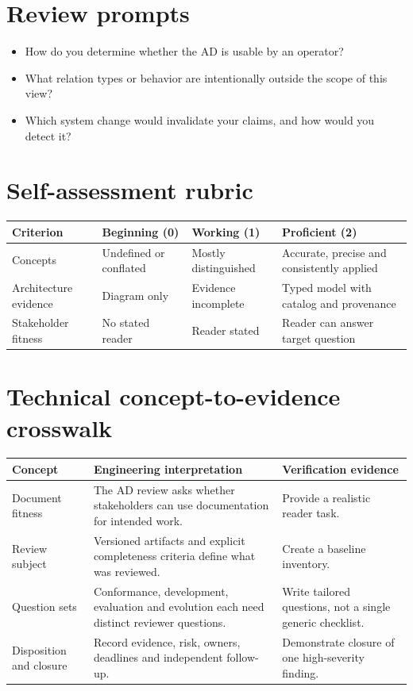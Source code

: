 \documentclass[10pt,letterpaper]{article}
\begin{document}
\section{Review prompts}
\begin{itemize}
\item How do you determine whether the AD is usable by an operator?
\item What relation types or behavior are intentionally outside the scope of this view?
\item Which system change would invalidate your claims, and how would you detect it?
\end{itemize}
\section{Self-assessment rubric}
\small
\begin{tabularx}{\linewidth}{@{}YYYY@{}}
\toprule
\textbf{Criterion} & \textbf{Beginning (0)} & \textbf{Working (1)} & \textbf{Proficient (2)} \\
\midrule
Concepts & Undefined or conflated & Mostly distinguished & Accurate, precise and consistently applied \\
Architecture evidence & Diagram only & Evidence incomplete & Typed model with catalog and provenance \\
Stakeholder fitness & No stated reader & Reader stated & Reader can answer target question \\
\bottomrule
\end{tabularx}
\normalsize
\section{Technical concept-to-evidence crosswalk}
\small
\begin{tabularx}{\linewidth}{@{}YYY@{}}
\toprule
\textbf{Concept} & \textbf{Engineering interpretation} & \textbf{Verification evidence} \\
\midrule
Document fitness & The AD review asks whether stakeholders can use documentation for intended work. & Provide a realistic reader task. \\
Review subject & Versioned artifacts and explicit completeness criteria define what was reviewed. & Create a baseline inventory. \\
Question sets & Conformance, development, evaluation and evolution each need distinct reviewer questions. & Write tailored questions, not a single generic checklist. \\
Disposition and closure & Record evidence, risk, owners, deadlines and independent follow-up. & Demonstrate closure of one high-severity finding. \\
\bottomrule
\end{tabularx}
\normalsize
\end{document}
